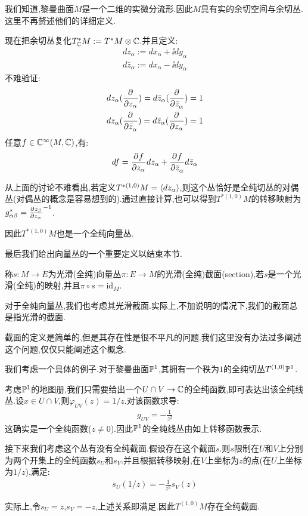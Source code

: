 \begin{example}[余切空间与余切丛]
	我们知道,黎曼曲面$M$是一个二维的实微分流形.因此$M$具有实的余切空间与余切丛.这里不再赘述他们的详细定义.

	现在把余切丛复化$T_{\mathbb{C}}^*M:=T^*M \otimes \mathbb{C}$.并且定义:
	\begin{align*}
	dz_\alpha:=dx_\alpha+\ii dy_\alpha\\
	d\bar{z}_\alpha:=dx_\alpha-\ii dy_\alpha 
	\end{align*}
	不难验证:
	\begin{align*}
		dz_\alpha(\frac{\partial^{} }{\partial {z_\alpha}^{}})=d\bar{z}_\alpha(\frac{\partial^{} }{\partial {\bar{z}_\alpha}^{}})=1\\
		dz_\alpha(\frac{\partial^{} }{\partial {\bar{z}_\alpha}^{}})=d\bar{z}_\alpha(\frac{\partial^{} }{\partial {z_\alpha}^{}})=1
	\end{align*}
	任意$f \in \mathbb{C}^\infty(M,\mathbb{C})$,有:
	\begin{align*}
		df=\frac{\partial^{} f}{\partial {z_\alpha}^{}}dz_\alpha+\frac{\partial^{} f}{\partial {\bar{z}_\alpha}^{}}d\bar{z}_\alpha
	\end{align*}

	从上面的讨论不难看出,若定义$T^{*(1,0)}M=\langle dz_\alpha\rangle$,则这个丛恰好是全纯切丛的对偶丛(对偶丛的概念是容易想到的).通过直接计算,也可以得到$T^{*(1,0)}M$的转移映射为$g^*_{\alpha\beta}=\frac{\partial^{} z_\beta}{\partial {z_\alpha}^{}}^{-1}$.

   因此$T^{*(1,0)}M$也是一个全纯向量丛.
\end{example}

最后我们给出向量丛的一个重要定义以结束本节.
\begin{definition}
	称$s:M \to E$为光滑(全纯)向量丛$\pi:E \to M$的光滑(全纯)截面(section),若$s$是一个光滑(全纯)的映射,并且$\pi \circ s =\mathrm{id}_M$.
\end{definition}
对于全纯向量丛,我们也考虑其光滑截面.实际上,不加说明的情况下,我们的截面总是指光滑的截面.

截面的定义是简单的,但是其存在性是很不平凡的问题.我们这里没有办法过多阐述这个问题,仅仅只能阐述这个概念.
\begin{example}[$\PP^1$的全纯线丛]
	我们考虑一个具体的例子.对于黎曼曲面$\PP^1$,其拥有一个秩为$1$的全纯切丛$T^{(1,0)}\mathbb{P}^1$.

	考虑$\PP^1$的地图册,我们只需要给出一个$U\cap V \to \mathbb{C}$的全纯函数,即可表达出该全纯线丛.设$x \in U\cap V$,则$\varphi_{UV}(z)=1/z$.对该函数求导:
	\begin{align*}
		g_{UV}=-\frac{1}{z^2}
	\end{align*}
	这确实是一个全纯函数($z\neq 0$).因此$\PP^1$的全纯线丛由如上转移函数表示.

	接下来我们考虑这个丛有没有全纯截面.假设存在这个截面$s$.则$s$限制在$U$和$V$上分别为两个开集上的全纯函数$s_U$和$s_V$.并且根据转移映射,在$V$上坐标为$z$的点(在$U$上坐标为$1/z$),满足:
	\begin{align*}
		s_U(1/z)=-\frac{1}{z^2}s_V(z)
	\end{align*}

	实际上,令$s_U=z$,$s_V=-z$,上述关系即满足.因此$T^{(1,0)}M$存在全纯截面.
\end{example}
